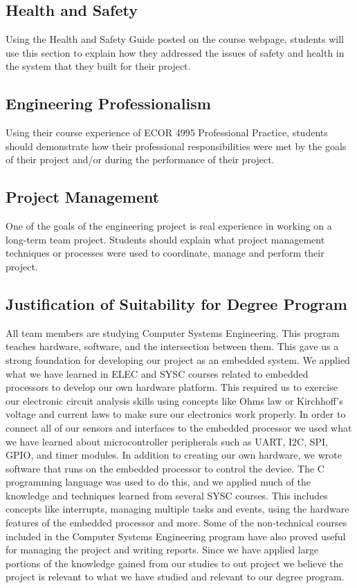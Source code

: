 \subsection{Health and Safety}
{\color{red}
Using the Health and Safety Guide posted on the course webpage, students will 
use this section to explain how they addressed the issues of safety and health 
in the system that they built for their project.
}

\subsection{Engineering Professionalism}
{\color{red}
Using their course experience of ECOR 4995 Professional Practice, students 
should demonstrate how their professional responsibilities were met by the 
goals of their project and/or during the performance of their project.
}

\subsection{Project Management}
{\color{red}
One of the goals of the engineering project is real experience in working on a 
long-term team project. Students should explain what project management 
techniques or processes were used to coordinate, manage and perform their project.
}

\subsection{Justification of Suitability for Degree Program}

All team members are studying Computer Systems Engineering.  This program
teaches hardware, software, and the intersection between them.  This gave us a
strong foundation for developing our project as an embedded system.  We
applied what we have learned in ELEC and SYSC courses related to embedded
processors to develop our own hardware platform.  This required us to
exercise our electronic circuit analysis skills using concepts like Ohms law or
Kirchhoff’s voltage and current laws to make sure our electronics work
properly.  In order to connect all of our sensors and interfaces to the
embedded processor we used what we have learned about microcontroller
peripherals such as UART, I2C, SPI, GPIO, and timer modules.  In addition to 
creating our own hardware, we wrote software that runs on the embedded processor
to control the device.  The C programming language was used to do this, and we 
applied much of the knowledge and techniques learned from several SYSC courses.  
This includes concepts like interrupts, managing multiple tasks and events, 
using the hardware features of the embedded processor and more.  Some of the
non-technical courses included in the Computer Systems Engineering program have 
also proved useful for managing the project and writing reports.  Since we 
have applied large portions of the knowledge gained from our studies to
out project we believe the project is relevant to what we have studied and 
relevant to our degree program.

